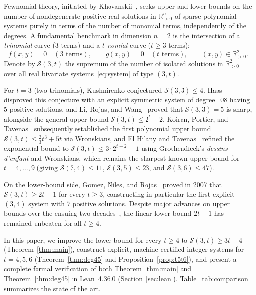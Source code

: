 \documentclass[11pt,a4paper]{amsart}
\theoremstyle{remark}
\newcommand{\R}{\mathbb{R}}
\newcommand{\Sfn}{\mathcal{S}}
\begin{document}
Fewnomial theory, initiated by Khovanskii~\cite{Khovanskii91}, seeks upper and lower bounds on the number of nondegenerate positive real solutions in $\R_{>0}^n$ of sparse polynomial systems purely in terms of the number of monomial terms, independently of the degrees. A fundamental benchmark in dimension $n = 2$ is the intersection of a \emph{trinomial} curve ($3$ terms) and a \emph{$t$-nomial} curve ($t \ge 3$ terms):
\begin{equation}\label{eq:system}
  f(x, y) = 0 \quad (3 \text{ terms}), \qquad g(x, y) = 0 \quad (t \text{ terms}), \qquad (x, y) \in \R_{>0}^2.
\end{equation}
Denote by $\Sfn(3, t)$ the supremum of the number of isolated solutions in $\R_{>0}^2$ over all real bivariate systems~\eqref{eq:system} of type $(3, t)$.

For $t = 3$ (two trinomials), Kushnirenko conjectured $\Sfn(3, 3) \le 4$. Haas~\cite{Haas02} disproved this conjecture with an explicit symmetric system of degree $108$ having $5$ positive solutions, and Li, Rojas, and Wang~\cite{LRW03} proved that $\Sfn(3, 3) = 5$ is sharp, alongside the general upper bound $\Sfn(3, t) \le 2^t - 2$. Koiran, Portier, and Tavenas~\cite{KPT15} subsequently established the first polynomial upper bound $\Sfn(3, t) \le \frac{2}{3}t^3 + 5t$ via Wronskians, and El Hilany and Tavenas~\cite{EHT24} refined the exponential bound to $\Sfn(3, t) \le 3 \cdot 2^{t-2} - 1$ using Grothendieck's \emph{dessins d'enfant} and Wronskians, which remains the sharpest known upper bound for $t = 4, \dots, 9$ (giving $\Sfn(3, 4) \le 11$, $\Sfn(3, 5) \le 23$, and $\Sfn(3, 6) \le 47$).

On the lower-bound side, Gomez, Niles, and Rojas~\cite{GNR07} proved in 2007 that $\Sfn(3, t) \ge 2t - 1$ for every $t \ge 3$, constructing in particular the first explicit $(3, 4)$ system with $7$ positive solutions. Despite major advances on upper bounds over the ensuing two decades~\cite{KPT15,EH18,EHT24,Bihan26}, the linear lower bound $2t - 1$ has remained unbeaten for all $t \ge 4$.

In this paper, we improve the lower bound for every $t \ge 4$ to $\Sfn(3, t) \ge 3t - 4$ (Theorem~\ref{thm:main}), construct explicit, machine-certified integer systems for $t = 4, 5, 6$ (Theorem~\ref{thm:deg45} and Proposition~\ref{prop:t5t6}), and present a complete formal verification of both Theorem~\ref{thm:main} and Theorem~\ref{thm:deg45} in Lean~4.36.0 (Section~\ref{sec:lean}). Table~\ref{tab:comparison} summarizes the state of the art.
\end{document}
